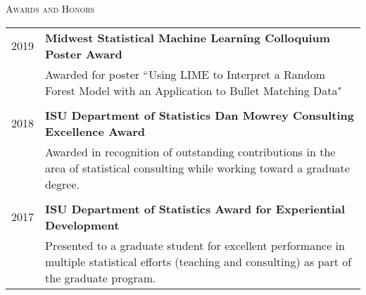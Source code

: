 \documentclass[10pt, oneside]{article}
\begin{document}
\noindent \textsc{Awards and Honors} \hrulefill
\begin{longtable}{p{3.5cm}p{13cm}}
\hfill{2019} & \textbf{Midwest Statistical Machine Learning Colloquium Poster Award}\\
& Awarded for poster ``Using LIME to Interpret a Random Forest Model with an Application to Bullet Matching Data"\\
\\
\hfill{2018} & \textbf{ISU Department of Statistics Dan Mowrey Consulting Excellence Award}\\
& Awarded in recognition of outstanding contributions in the area of statistical consulting while working toward a graduate degree.\\
\\
\hfill{2017} & \textbf{ISU Department of Statistics Award for Experiential Development}\\
& Presented to a graduate student for excellent performance in multiple statistical efforts (teaching and consulting) as part of the graduate program.
\end{longtable}
\end{document}
